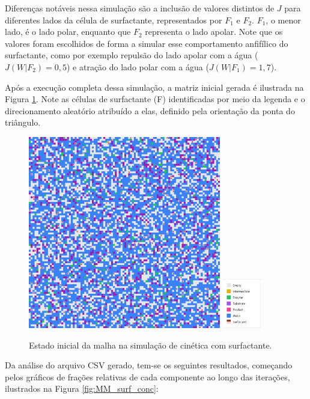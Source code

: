\documentclass[12pt,oneside]{report}
\begin{document}
Diferenças notáveis nessa simulação são a inclusão de valores distintos de $J$ para diferentes lados da célula de surfactante, representados por $F_1$ e $F_2$. $F_1$, o menor lado, é o lado polar, enquanto que $F_2$ representa o lado apolar. Note que os valores foram escolhidos de forma a simular esse comportamento anfifílico do surfactante, como por exemplo repulsão do lado apolar com a água ($J (W|F_2) = 0{,}5$) e atração do lado polar com a água ($J (W|F_1) = 1{,}7$).

Após a execução completa dessa simulação, a matriz inicial gerada é ilustrada na Figura \ref{fig:MM_surf_initial}. Note as células de surfactante (F) identificadas por meio da legenda e o direcionamento aleatório atribuído a elas, definido pela orientação da ponta do triângulo.

\begin{figure}[H]
    \centering
    \includegraphics[width=0.75\textwidth]{img/MM_surf_initial.png}
    \hspace{0.05\textwidth}
    \includegraphics[width=0.15\textwidth]{img/legend_surf.png}
    \caption{\small Estado inicial da malha na simulação de cinética com surfactante.}
    \label{fig:MM_surf_initial}
\end{figure}

Da análise do arquivo CSV gerado, tem-se os seguintes resultados, começando pelos gráficos de frações relativas de cada componente ao longo das iterações, ilustrados na Figura \ref{fig:MM_surf_conc}:
\end{document}
